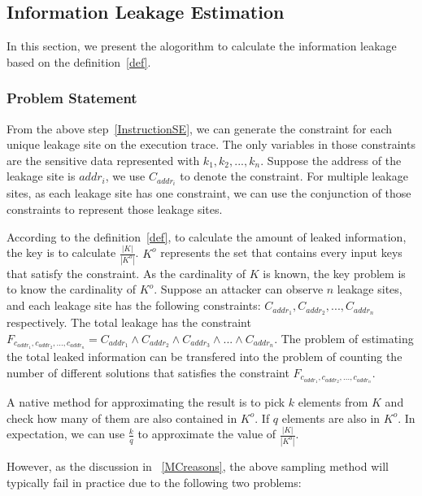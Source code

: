 \subsection{Information Leakage Estimation}

In this section, we present the alogorithm to calculate the information
leakage based on the definition~\ref{def}. 

\subsubsection{Problem Statement}
From the above step~\ref{InstructionSE}, we can generate the constraint 
for each unique leakage site on the execution trace.
The only variables in those constraints are the sensitive data represented
with $k_1, k_2, ... , k_n$. Suppose the address of the leakage site is $addr_i$,
we use $C_{addr_i}$ to denote the constraint. For multiple leakage sites, 
as each leakage site has one constraint, we can 
use the conjunction of those constraints to represent those leakage sites. 

According to the definition~\ref{def}, to calculate the amount of leaked 
information, the key is to calculate $\frac{|K|}{|K^o|}$. $K^o$ represents
the set that contains every input keys that satisfy the constraint. As the 
cardinality of $K$ is known, the key problem is to know the cardinality of
$K^o$. Suppose an attacker can observe $n$ leakage sites, and each leakage site has
the following constraints: $C_{addr_1}, C_{addr_2}, ..., C_{addr_n}$ respectively. 
The total leakage has the constraint 
$F_{c_{addr_1},c_{addr_2},...,c_{addr_n}} = C_{addr_1} \land C_{addr_2} \land C_{addr_3}
\land ... \land C_{addr_n}$. The problem of estimating the total leaked information 
can be transfered into the problem of counting the number of different solutions 
that satisfies the constraint $F_{c_{addr_1},c_{addr_2},...,c_{addr_n}}$. 

A native method for approximating 
the result is to pick $k$ elements from $K$ and check how many of them are also
contained in $K^o$. If $q$ elements are also in $K^o$. In expectation, we can
use $\frac{k}{q}$ to approximate the value of $\frac{|K|}{|K^o|}$.

However, as the discussion in ~\ref{MCreasons},
the above sampling method will typically fail in practice due to the following two problems:

